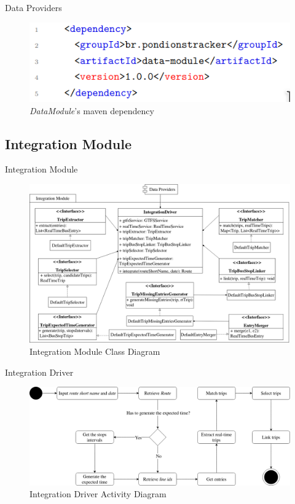 \documentclass[xcolor=dvipsnames,table]{beamer}
\begin{document}
\begin{frame}{Data Providers}
        \begin{figure}[H]
                \centering
                \includegraphics[scale=0.45]{images/mddatamodule.png}
                \caption{\textit{DataModule}'s maven dependency}
        \end{figure}
\end{frame}

\subsection{Integration Module}
\begin{frame}{Integration Module}
        \begin{figure}[H]
                \centering
                \includegraphics[scale=.205]{images/integrationModuleCD.png}
                \caption{Integration Module Class Diagram}
        \end{figure}
\end{frame}
\begin{frame}{Integration Driver}
        \begin{figure}[H]
                \centering
                \includegraphics[width = \textwidth]{images/integrationDriverAD.drawio.png}
                \caption{Integration Driver Activity Diagram}
        \end{figure}
\end{frame}
\end{document}
